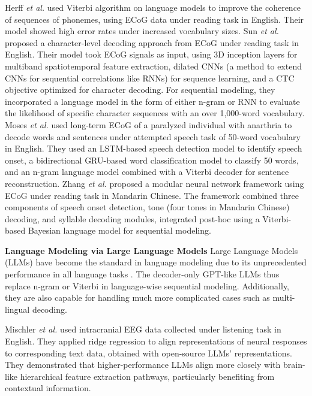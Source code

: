 \documentclass[journal]{IEEEtran}
\begin{document}
Herff \emph{et al.} \cite{Herff2015} used Viterbi algorithm on language models to improve the coherence of sequences of phonemes, using ECoG data under reading task in English. Their model showed high error rates under increased vocabulary sizes. Sun \emph{et al.} \cite{Sun2020} proposed a character-level decoding approach from ECoG under reading task in English. Their model took ECoG signals as input, using 3D inception layers for multiband spatiotemporal feature extraction, dilated CNNs (a method to extend CNNs for sequential correlations like RNNs) for sequence learning, and a CTC objective optimized for character decoding. For sequential modeling, they incorporated a language model in the form of either n-gram or RNN to evaluate the likelihood of specific character sequences with an over 1,000-word vocabulary. Moses \emph{et al.} \cite{Moses2021} used long-term ECoG of a paralyzed individual with anarthria to decode words and sentences under attempted speech task of 50-word vocabulary in English. They used an LSTM-based speech detection model to identify speech onset, a bidirectional GRU-based word classification model to classify 50 words, and an n-gram language model combined with a Viterbi decoder for sentence reconstruction. Zhang \emph{et al.} \cite{Zhang2024c} proposed a modular neural network framework using ECoG under reading task in Mandarin Chinese. The framework combined three components of speech onset detection, tone (four tones in Mandarin Chinese) decoding, and syllable decoding modules, integrated post-hoc using a Viterbi-based Bayesian language model for sequential modeling.

\textbf{Language Modeling via Large Language Models} Large Language Models (LLMs) have become the standard in language modeling due to its unprecedented performance in all language tasks \cite{Brown2020, Zhao2023LLM}. The decoder-only GPT-like LLMs thus replace n-gram or Viterbi in language-wise sequential modeling. Additionally, they are also capable for handling much more complicated cases such as multi-lingual decoding.

Mischler \emph{et al.} \cite{Mischler2024} used intracranial EEG data collected under listening task in English. They applied ridge regression to align representations of neural responses to corresponding text data, obtained with open-source LLMs' representations. They demonstrated that higher-performance LLMs align more closely with brain-like hierarchical feature extraction pathways, particularly benefiting from contextual information.
\end{document}

